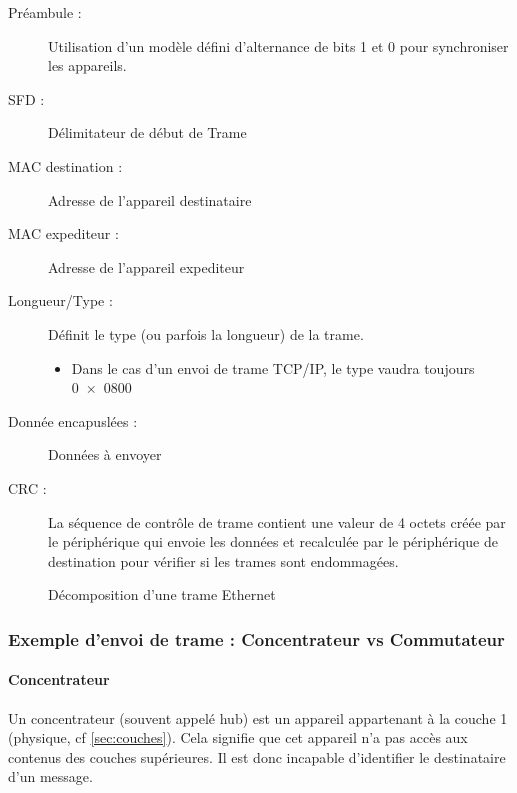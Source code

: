 \begin{description}
  \item [Préambule : ] Utilisation d’un modèle défini d’alternance de bits 1 et 0 pour synchroniser les appareils.
  \item [SFD : ]Délimitateur de début de Trame
  \item [MAC destination : ] Adresse de l'appareil destinataire
  \item [MAC expediteur : ] Adresse de l'appareil expediteur
  \item [Longueur/Type : ] Définit le type (ou parfois la longueur) de la trame.
  \begin{itemize}
    \item Dans le cas d'un envoi de trame TCP/IP, le type vaudra toujours \num{0x0800}
  \end{itemize}
  \item [Donnée encapuslées : ]Données à envoyer
  \item [CRC : ] La séquence de contrôle de trame contient une valeur de 4 octets créée par le périphérique qui envoie les données et recalculée par le périphérique de destination pour vérifier si les trames sont endommagées.
\end{description}


\begin{figure}
\centering
    
  \caption{Décomposition d'une trame Ethernet}
\end{figure}

\subsubsection{Exemple d'envoi de trame : Concentrateur vs Commutateur}
\paragraph{Concentrateur}
Un concentrateur (souvent appelé hub) est un appareil appartenant à la couche 1 (physique, cf \ref{sec:couches}). Cela signifie que cet appareil n'a pas accès aux contenus des couches supérieures. Il est donc incapable d'identifier le destinataire d'un message.

